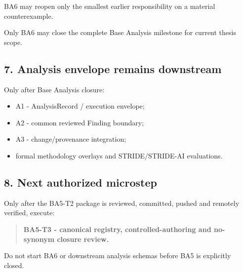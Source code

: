 \documentclass[
  10pt,
  a4paper,
]{article}
\providecommand{\tightlist}{%
  \setlength{\itemsep}{0pt}\setlength{\parskip}{0pt}}
\begin{document}
BA6 may reopen only the smallest earlier responsibility on a material
counterexample.

Only BA6 may close the complete Base Analysis milestone for current
thesis scope.

\subsection{7. Analysis envelope remains
downstream}\label{analysis-envelope-remains-downstream}

Only after Base Analysis closure:

\begin{itemize}
\tightlist
\item
  A1 - AnalysisRecord / execution envelope;
\item
  A2 - common reviewed Finding boundary;
\item
  A3 - change/provenance integration;
\item
  formal methodology overlays and STRIDE/STRIDE-AI evaluations.
\end{itemize}

\subsection{8. Next authorized
microstep}\label{next-authorized-microstep}

Only after the BA5-T2 package is reviewed, committed, pushed and
remotely verified, execute:

\begin{quote}
\textbf{BA5-T3 - canonical registry, controlled-authoring and no-synonym
closure review.}
\end{quote}

Do not start BA6 or downstream analysis schemas before BA5 is explicitly
closed.
\end{document}

